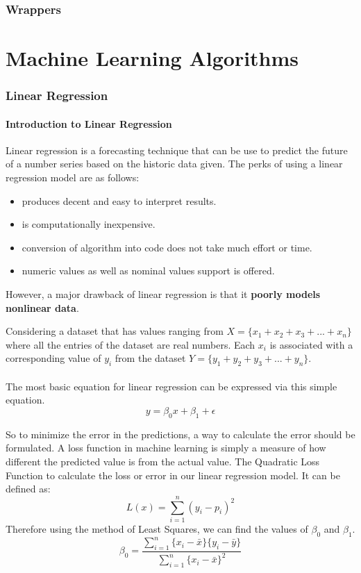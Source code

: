 \documentclass[12pt]{article}
\begin{document}
\section{Wrappers}
\newpage
\part{Machine Learning Algorithms}
\newpage
\section{Linear Regression}
\subsection{Introduction to Linear Regression}
Linear regression is a forecasting technique that can be use to predict the future of a number series based on the historic data given. The perks of using a linear regression model are as follows:

\begin{itemize}
  \item produces decent and  easy to interpret results.
  \item is computationally inexpensive.
  \item conversion of algorithm into code does not take much effort or time.
  \item numeric values as well as nominal values support is offered.
\end{itemize}

However, a major drawback of linear regression is that it \textbf{poorly models nonlinear data}.

Considering a dataset that has values ranging from $X = \lbrace x_{1}+x_{2}+x_{3}+...+x_{n} \rbrace$ where
all the entries of the dataset are real numbers. Each $x_{i}$ is associated with a corresponding value of
$y_{i}$ from the dataset $Y = \lbrace y_{1}+y_{2}+y_{3}+...+y_{n} \rbrace$.
\\\\
The most basic equation for linear regression can be expressed via this simple equation.
$$y = \beta_{0}x+\beta_{1}+\epsilon$$

So to minimize the error in the predictions, a way to calculate the error should be formulated. A loss function in machine learning is simply a measure of how different the predicted value is from the actual value. The Quadratic Loss Function to calculate the loss or error in our linear regression model. It can be defined as:
$$L(x) = \sum_{i=1}^{n}(y_{i}-p_{i})^{2} $$
Therefore using the method of Least Squares, we can find the values of $\beta_{0}$ and $\beta_{1}$.
\\
$$\beta_{0} = \frac{\sum_{i=1}^{n} \lbrace x_{i}-\bar{x}\rbrace \lbrace y_{i}-\bar{y} \rbrace}{\sum_{i=1}^{n} \lbrace x_{i}-\bar{x}\rbrace^{2} } $$
\\
\end{document}
